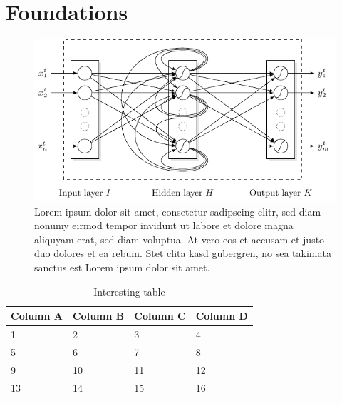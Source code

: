 \chapter{Foundations}\label{chapter:foundations}
%



\begin{figure}[t]
    \centering
    \includegraphics[]{figures/rnnfull/rnnfull}
    \caption{Lorem ipsum dolor sit amet, consetetur sadipscing elitr, sed diam nonumy eirmod tempor invidunt ut labore et dolore magna aliquyam erat, sed diam voluptua. At vero eos et accusam et justo duo dolores et ea rebum. Stet clita kasd gubergren, no sea takimata sanctus est Lorem ipsum dolor sit amet.}
    \label{figure:rnnfull}
\end{figure}



\begin{table}[t]
\centering
\caption{Interesting table}
\label{table:data}
\small
\begin{tabularx}{\textwidth}{XXXX}
\toprule
Column A & Column B & Column C & Column D\\
\midrule
1 & 2 & 3 & 4\\
5 & 6 & 7 & 8\\
9 & 10 & 11 & 12\\
13 & 14 & 15 & 16\\
\bottomrule
\end{tabularx}    
    
    
\end{table}